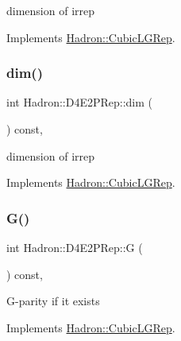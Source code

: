 dimension of irrep 

Implements \mbox{\hyperlink{structHadron_1_1CubicLGRep_a3acbaea26503ed64f20df693a48e4cdd}{Hadron\+::\+Cubic\+L\+G\+Rep}}.

\mbox{\label{structHadron_1_1D4E2PRep_a840b6fdd348949a1a1c0fa8c2f9f9ecd}} 
\subsubsection{\texorpdfstring{dim()}{dim()}\hspace{0.1cm}{\footnotesize\ttfamily [2/2]}}
{\footnotesize\ttfamily int Hadron\+::\+D4\+E2\+P\+Rep\+::dim (\begin{DoxyParamCaption}{ }\end{DoxyParamCaption}) const\hspace{0.3cm}{\ttfamily [inline]}, {\ttfamily [virtual]}}

dimension of irrep 

Implements \mbox{\hyperlink{structHadron_1_1CubicLGRep_a3acbaea26503ed64f20df693a48e4cdd}{Hadron\+::\+Cubic\+L\+G\+Rep}}.

\mbox{\label{structHadron_1_1D4E2PRep_a4c158750cdc343ec7ed414e42b4f757a}} 
\subsubsection{\texorpdfstring{G()}{G()}\hspace{0.1cm}{\footnotesize\ttfamily [1/2]}}
{\footnotesize\ttfamily int Hadron\+::\+D4\+E2\+P\+Rep\+::G (\begin{DoxyParamCaption}{ }\end{DoxyParamCaption}) const\hspace{0.3cm}{\ttfamily [inline]}, {\ttfamily [virtual]}}

G-\/parity if it exists 

Implements \mbox{\hyperlink{structHadron_1_1CubicLGRep_ace26f7b2d55e3a668a14cb9026da5231}{Hadron\+::\+Cubic\+L\+G\+Rep}}.

\mbox{\label{structHadron_1_1D4E2PRep_a4c158750cdc343ec7ed414e42b4f757a}} 
